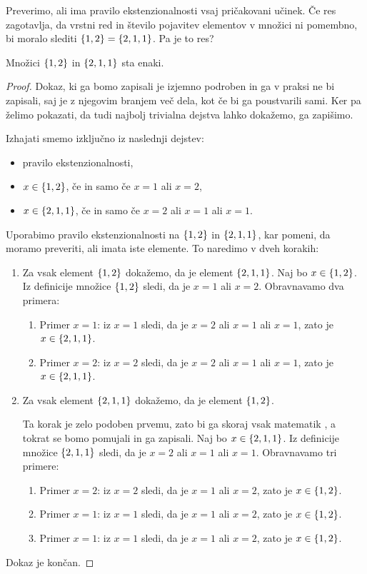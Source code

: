 Preverimo, ali ima pravilo ekstenzionalnosti vsaj pričakovani učinek.
%
Če res zagotavlja, da vrstni red in število pojavitev elementov v množici ni pomembno, bi moralo slediti
$\left\{1, 2\right\} = \left\{2, 1, 1\right\}$. Pa je to res?

\begin{trditev}
  Množici $\left\{1, 2\right\}$ in $\left\{2, 1, 1\right\}$ sta enaki.
\end{trditev}

\begin{proof}
  Dokaz, ki ga bomo zapisali je izjemno podroben in ga v praksi ne bi zapisali,
  saj je z njegovim branjem več dela, kot če bi ga poustvarili sami. Ker pa želimo pokazati, da
  tudi najbolj trivialna dejstva lahko dokažemo, ga zapišimo.

  Izhajati smemo izključno iz naslednji dejstev:
  \begin{itemize}
  \item pravilo ekstenzionalnosti,
  \item $x \in \left\{1, 2\right\}$, če in samo če $x = 1$ ali $x = 2$,
  \item $x \in \left\{2, 1, 1\right\}$, če in samo če $x = 2$ ali $x = 1$ ali $x = 1$.
  \end{itemize}
  Uporabimo pravilo ekstenzionalnosti na $\left\{1, 2\right\}$ in
  $\left\{2, 1, 1\right\}$, kar pomeni, da moramo preveriti, ali imata iste elemente. To
  naredimo v dveh korakih:
  \begin{enumerate}
  \item Za vsak element $\left\{1, 2\right\}$ dokažemo, da je element $\left\{2, 1, 1\right\}$.
    Naj bo $x \in \left\{1, 2\right\}$. Iz definicije množice $\left\{1, 2\right\}$
    sledi, da je $x = 1$ ali $x = 2$. Obravnavamo dva primera:
    \begin{enumerate}
    \item Primer $x = 1$: iz $x = 1$ sledi, da je $x = 2$ ali $x = 1$ ali $x = 1$, zato je $x \in \left\{2, 1, 1\right\}$.
    \item Primer $x = 2$: iz $x = 2$ sledi, da je $x = 2$ ali $x = 1$ ali $x = 1$, zato je $x \in \left\{2, 1, 1\right\}$.
    \end{enumerate}
  \item Za vsak element $\left\{2, 1, 1\right\}$ dokažemo, da je element $\left\{1, 2\right\}$.

    Ta korak je zelo podoben prvemu, zato bi ga skoraj vsak matematik ,
    a tokrat se bomo pomujali in ga zapisali.
    Naj bo $x \in \left\{2, 1, 1\right\}$. Iz definicije množice $\left\{2, 1, 1\right\}$ sledi, da je $x = 2$ ali
    $x = 1$ ali $x = 1$. Obravnavamo tri primere:
    \begin{enumerate}
    \item Primer $x = 2$: iz $x = 2$ sledi, da je $x = 1$ ali $x = 2$, zato je $x \in \left\{1, 2\right\}$.
    \item Primer $x = 1$: iz $x = 1$ sledi, da je $x = 1$ ali $x = 2$, zato je $x \in \left\{1, 2\right\}$.
    \item Primer $x = 1$: iz $x = 1$ sledi, da je $x = 1$ ali $x = 2$, zato je $x \in \left\{1, 2\right\}$.
    \end{enumerate}
  \end{enumerate}
  Dokaz je končan.
\end{proof}

